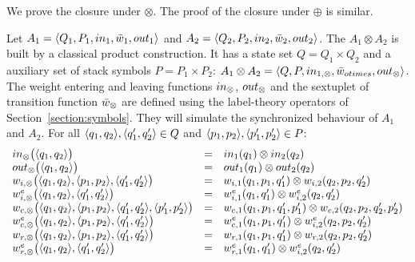 %
%
We prove the closure under $\otimes$. 
The proof of the closure under $\oplus$ is similar.

Let $A_1 = \< Q_1, P_1, \init_1, \bar\wei_1, \final_1 >$
and $A_2 = \< Q_2, P_2, \init_2, \bar\wei_2, \final_2 >$.
The \SWVPA $A_1 \otimes A_2$ is built by a 
classical product construction.
%
It has a state set $Q = Q_1 \times Q_2$
and a auxiliary set of stack symbols $P = P_1 \times P_2$:
$A_1 \otimes A_2 = \< Q, P, \init_{1, \otimes}, 
         \bar\wei_{otimes}, \final_{\otimes} >$.
The weight entering and leaving functions         
$\init_{\otimes}$, $\final_{\otimes}$
and the sextuplet of transition function $\bar\wei_{\otimes}$
are defined 
using the label-theory operators of Section~\ref{section:symbols}.
They will simulate the synchronized behaviour of $A_1$ and $A_2$.
%
For all $\< q_1, q_2>, \< q'_1, q'_2> \in Q$ 
and $\< p_1, p_2>, \< p'_1, p'_2> \in P$:
\[
\begin{array}{lcl}
\init_{\otimes}\bigl(\< q_1, q_2>\bigr) & = & \init_{1}(q_1) \otimes \init_{2}(q_2)\\
\final_{\otimes}\bigl(\< q_1, q_2>\bigr) & = & \final_{1}(q_1) \otimes \final_{2}(q_2)\\
%
\wei_{\mathsf{i}, \otimes}\bigl(\< q_1, q_2>, \<p_1, p_2>, \<q'_1, q'_2>\bigr) & = &
\wei_{\mathsf{i}, 1}(q_1, p_1, q'_1) \otimes \wei_{\mathsf{i}, 2}(q_2, p_2, q'_2)\\
%
\weie[\mathsf{i}, \otimes]\bigl(\< q_1, q_2>, \<q'_1, q'_2>\bigr) & = &
\weie[\mathsf{i}, 1](q_1, q'_1) \otimes \weie[\mathsf{i}, 2](q_2, q'_2)\\
%
\wei_{\mathsf{c}, \otimes}\bigl(\< q_1, q_2>, \<p_1, p_2>, \<q'_1, q'_2>, \<p'_1, p'_2>\bigr) & = &
\wei_{\mathsf{c}, 1}(q_1, p_1, q'_1, p'_1) \otimes \wei_{\mathsf{c}, 2}(q_2, p_2, q'_2, p'_2)\\
%
\weie[\mathsf{c}, \otimes]\bigl(\< q_1, q_2>, \<p_1, p_2>, \<q'_1, q'_2>\bigr) & = &
\weie[\mathsf{c}, 1](q_1, p_1, q'_1) \otimes \weie[\mathsf{i}, 2](q_2, p_2, q'_2)\\
%
\wei_{\mathsf{r}, \otimes}\bigl(\< q_1, q_2>, \<p_1, p_2>, \<q'_1, q'_2>\bigr) & = &
\wei_{\mathsf{r}, 1}(q_1, p_1, q'_1) \otimes \wei_{\mathsf{r}, 2}(q_2, p_2, q'_2)\\
%
\weie[\mathsf{r}, \otimes]\bigl(\< q_1, q_2>, \<q'_1, q'_2>\bigr) & = &
\weie[\mathsf{r}, 1](q_1, q'_1) \otimes \weie[\mathsf{i}, 2](q_2, q'_2)\\
\end{array}
\]






